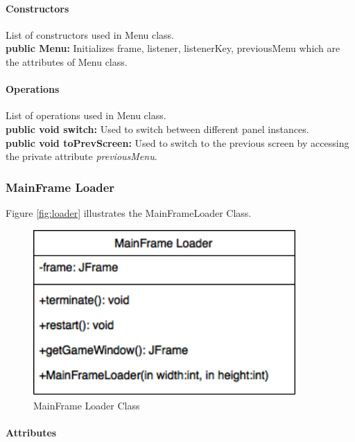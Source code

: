 \documentclass[12pt]{article} %
\begin{document}
\paragraph{Constructors \\}
List of constructors used in Menu class.\\
\textbf{public Menu:} Initializes frame, listener, listenerKey, previousMenu which are the attributes of Menu class.

\paragraph{Operations \\}
List of operations used in Menu class.\\
\textbf{public void switch:} Used to switch between different panel instances.\\
\textbf{public void toPrevScreen:} Used to switch to the previous screen by accessing the private attribute \textit{previousMenu}.

\subsubsection{MainFrame Loader}

Figure \ref{fig:loader} illustrates the MainFrameLoader Class.
\begin{figure}[h!]
   \centering
   \vspace{10pt}%
   \includegraphics[width=10cm]{loader.png}
   \caption{MainFrame Loader Class}
   \label{fig:mainframeloader}
\end{figure}

\paragraph{Attributes \\}
\end{document}
